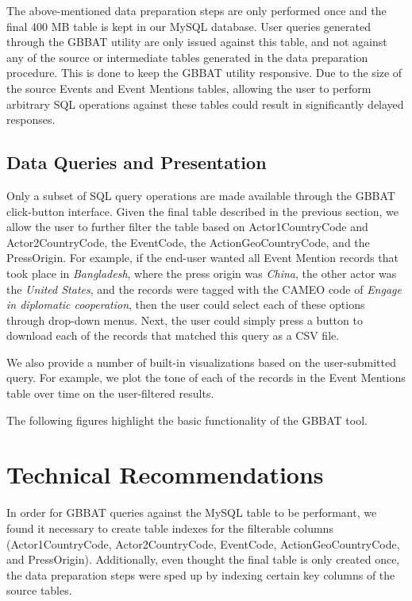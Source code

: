 \documentclass[preprint,authoryear,12pt]{elsarticle/elsarticle}
\begin{document}
The above-mentioned data preparation steps are only performed once and the final 400 MB table is kept in our MySQL database. User queries generated through the GBBAT utility are only issued against this table, and not against any of the source or intermediate tables generated in the data preparation procedure. This is done to keep the GBBAT utility responsive. Due to the size of the source Events and Event Mentions tables, allowing the user to perform arbitrary SQL operations against these tables could result in significantly delayed responses. 

\subsection{Data Queries and Presentation}
Only a subset of SQL query operations are made available through the GBBAT click-button interface. Given the final table described in the previous section, we allow the user to further filter the table based on Actor1CountryCode and Actor2CountryCode, the EventCode, the ActionGeoCountryCode, and the PressOrigin. For example, if the end-user wanted all Event Mention records that took place in \emph{Bangladesh}, where the press origin was \emph{China}, the other actor was the \emph{United States}, and the records were tagged with the CAMEO code of \emph{Engage in diplomatic cooperation}, then the user could select each of these options through drop-down menus. Next, the user could simply press a button to download each of the records that matched this query as a CSV file. 

We also provide a number of built-in visualizations based on the user-submitted query. For example, we plot the tone of each of the records in the Event Mentions table over time on the user-filtered results. 

The following figures highlight the basic functionality of the GBBAT tool. 

\section{Technical Recommendations}
In order for GBBAT queries against the MySQL table to be performant, we found it necessary to create table indexes for the filterable columns (Actor1CountryCode, Actor2CountryCode, EventCode, ActionGeoCountryCode, and PressOrigin). Additionally, even thought the final table is only created once, the data preparation steps were sped up by indexing certain key columns of the source tables.  
\end{document}
